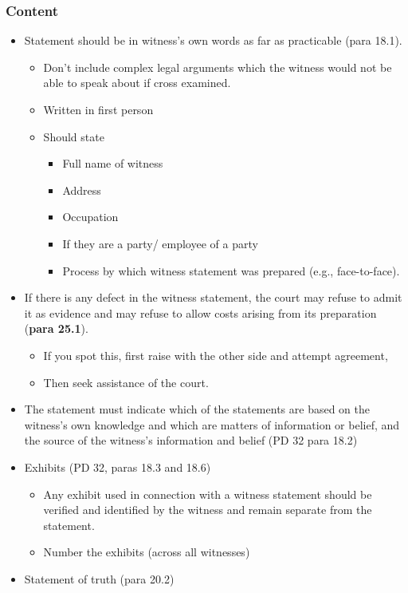 \documentclass[
]{article}
\providecommand{\tightlist}{%
  \setlength{\itemsep}{0pt}\setlength{\parskip}{0pt}}
\begin{document}
\hypertarget{content}{%
\subsubsection{Content}\label{content}}

\begin{itemize}
\tightlist
\item
  Statement should be in witness's own words as far as practicable (para
  18.1).

  \begin{itemize}
  \tightlist
  \item
    Don't include complex legal arguments which the witness would not be
    able to speak about if cross examined.
  \item
    Written in first person
  \item
    Should state

    \begin{itemize}
    \tightlist
    \item
      Full name of witness
    \item
      Address
    \item
      Occupation
    \item
      If they are a party/ employee of a party
    \item
      Process by which witness statement was prepared (e.g.,
      face-to-face).
    \end{itemize}
  \end{itemize}
\item
  If there is any defect in the witness statement, the court may refuse
  to admit it as evidence and may refuse to allow costs arising from its
  preparation (\textbf{para 25.1}).

  \begin{itemize}
  \tightlist
  \item
    If you spot this, first raise with the other side and attempt
    agreement,
  \item
    Then seek assistance of the court.
  \end{itemize}
\item
  The statement must indicate which of the statements are based on the
  witness's own knowledge and which are matters of information or
  belief, and the source of the witness's information and belief (PD 32
  para 18.2)
\item
  Exhibits (PD 32, paras 18.3 and 18.6)

  \begin{itemize}
  \tightlist
  \item
    Any exhibit used in connection with a witness statement should be
    verified and identified by the witness and remain separate from the
    statement.
  \item
    Number the exhibits (across all witnesses)
  \end{itemize}
\item
  Statement of truth (para 20.2)


\end{itemize}
\end{document}
